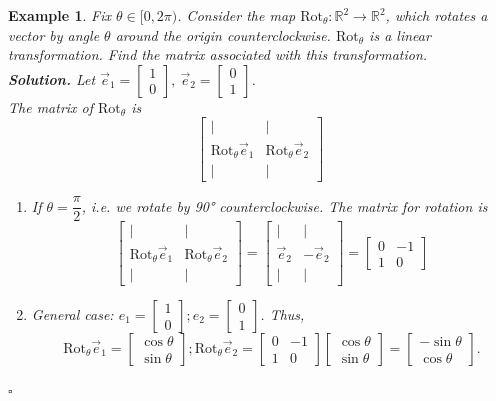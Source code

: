 \documentclass[12pt, a4paper]{article}
\newtheorem{eg}{Example}[subsection]
\newenvironment*{sol}{\indent\textbf{Solution. }}{\hfill{$\square$}\par}
\def\R{{\mathbb{R}}}
\def\vece{\vec{e}}
\begin{document}
\begin{eg}
Fix $\theta \in [0, 2\pi )$. Consider the map $\text{Rot}_\theta: \R^2 \rightarrow\R^2$, which rotates a vector by angle $\theta$ around the origin counterclockwise. $\text{Rot}_\theta$ is a linear transformation. Find the matrix associated with this transformation.\\
\begin{sol}
Let $\vece_1=\begin{bmatrix}1\\0\end{bmatrix},\ \vece_2=\begin{bmatrix}0\\1\end{bmatrix}$. \\
The matrix of $\text{Rot}_\theta$ is 
$$\begin{bmatrix}|&|\\ \text{Rot}_{\theta}\vece_1& \text{Rot}_{\theta}\vece_2\\|&|\end{bmatrix}$$
\begin{enumerate}
\item If $\theta = \dfrac{\pi}{2}$, i.e. we rotate by 90° counterclockwise. The matrix for rotation is $$\begin{bmatrix}|&|\\ \text{Rot}_{\theta}\vece_1& \text{Rot}_{\theta}\vece_2\\|&|\end{bmatrix}=\begin{bmatrix}|&|\\ \vece_2& -\vece_2\\|&|\end{bmatrix}=\begin{bmatrix}0&-1\\1&0\end{bmatrix}$$
\item General case: 
$e_1=\begin{bmatrix}1\\0\end{bmatrix};e_2=\begin{bmatrix}0\\1\end{bmatrix}$. Thus, $$\text{Rot}_{\theta}\vece_1=\begin{bmatrix}\cos{\theta}\\\sin{\theta}\end{bmatrix};\text{Rot}_{\theta}\vece_2=\begin{bmatrix}0&-1\\1&0\end{bmatrix}\begin{bmatrix}\cos{\theta}\\\sin{\theta}\end{bmatrix}=\begin{bmatrix}-\sin{\theta}\\\cos{\theta}\end{bmatrix}.$$

\end{enumerate}
\end{sol}
\end{eg}
\end{document}
